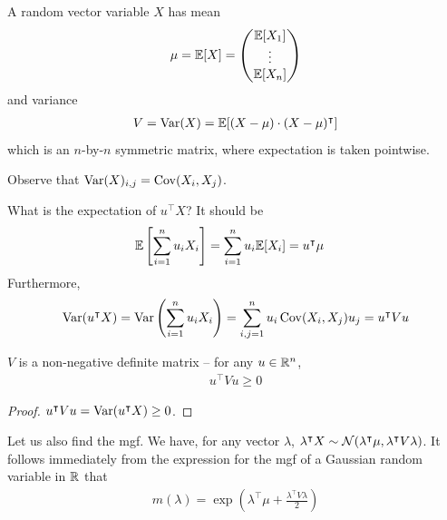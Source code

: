 \documentclass{../../template/note}
\begin{document}
    \begin{definition}
        A random vector variable \(X\) has mean
        \begin{align*}
            \mu = \mathbb E[X] = \begin{pmatrix}
             \mathbb E[X_1] \\
             \vdots \\
             \mathbb E[X_n] \\
            \end{pmatrix}   
        \end{align*}
        and variance
        \begin{align*}
            V = \operatorname{Var}(X) = \mathbb E[(X-\mu) \cdot (X-\mu)^\intercal]
        \end{align*}
        which is an \(n\)-by-\(n\) symmetric matrix, where expectation is taken pointwise.
    \end{definition}
    
    \begin{remark*}
        Observe that \(\operatorname{Var}(X)_{i,j} = \operatorname{Cov}(X_i, X_j)\).
    \end{remark*}
    

    What is the expectation of \(u^\intercal X\)? It should be
    \begin{align*}
        \mathbb E\left[\sum_{i=1}^n u_iX_i\right] &= \sum_{i=1}^n u_i\mathbb E[X_i] = u^\intercal \mu
    \end{align*}
    Furthermore,
    \begin{align*}
        \operatorname{Var}(u^\intercal X) = \operatorname{Var}\left(\sum_{i=1}^n u_iX_i\right) = \sum_{i,j=1}^n u_i \operatorname{Cov}(X_i, X_j) u_j = u^\intercal V u
    \end{align*}
    
    \begin{proposition}
        \(V\) is a non-negative definite matrix -- for any \(u \in \mathbb R^n\),
        \begin{align*}
            u^\intercal V u \geq 0
        \end{align*}
    \end{proposition}
    
    \begin{proof}
        \(u^\intercal V u = \operatorname{Var}(u^\intercal X) \geq 0\).
    \end{proof}
    
    Let us also find the mgf. We have, for any vector \(\lambda\), \(\lambda^\intercal X \sim \mathcal{N}(\lambda^\intercal \mu, \lambda^\intercal V \lambda)\). It follows immediately from the expression for the mgf of a Gaussian random variable in \(\mathbb R\) that 
    \begin{align*}
        m(\lambda) = \exp\left(\lambda^\intercal \mu + \frac{\lambda^\intercal V \lambda} 2\right)
    \end{align*}
    
\end{document}
